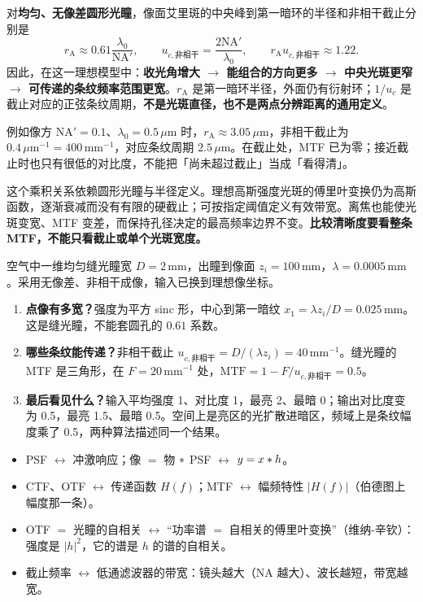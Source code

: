 \begin{idea}
对\textbf{均匀、无像差圆形光瞳}，像面艾里斑的中央峰到第一暗环的半径和非相干截止分别是
\[
r_{\mathrm A}\approx0.61\frac{\lambda_0}{\mathrm{NA}'},\qquad
u_{c,\text{非相干}}=\frac{2\mathrm{NA}'}{\lambda_0},\qquad
r_{\mathrm A}u_{c,\text{非相干}}\approx1.22.
\]
因此，在这一理想模型中：\textbf{收光角增大 $\to$ 能组合的方向更多 $\to$ 中央光斑更窄 $\to$ 可传递的条纹频率范围更宽}。$r_{\mathrm A}$ 是第一暗环半径，外面仍有衍射环；$1/u_c$ 是截止对应的正弦条纹周期，\textbf{不是光斑直径，也不是两点分辨距离的通用定义}。

例如像方 $\mathrm{NA}'=0.1$、$\lambda_0=0.5\,\mu\mathrm m$ 时，$r_{\mathrm A}\approx3.05\,\mu\mathrm m$，非相干截止为 $0.4\,\mu\mathrm m^{-1}=400\,\mathrm{mm}^{-1}$，对应条纹周期 $2.5\,\mu\mathrm m$。在截止处，MTF 已为零；接近截止时也只有很低的对比度，不能把「尚未超过截止」当成「看得清」。

这个乘积关系依赖圆形光瞳与半径定义。理想高斯强度光斑的傅里叶变换仍为高斯函数，逐渐衰减而没有有限的硬截止；可按指定阈值定义有效带宽。离焦也能使光斑变宽、MTF 变差，而保持孔径决定的最高频率边界不变。\textbf{比较清晰度要看整条 MTF，不能只看截止或单个光斑宽度。}
\end{idea}

空气中一维均匀缝光瞳宽 $D=2\,\mathrm{mm}$，出瞳到像面 $z_i=100\,\mathrm{mm}$，$\lambda=0.0005\,\mathrm{mm}$。采用无像差、非相干成像，输入已换到理想像坐标。
\begin{enumerate}
\item \textbf{点像有多宽？}强度为平方 sinc 形，中心到第一暗纹 $x_1=\lambda z_i/D=0.025\,\mathrm{mm}$。这是缝光瞳，不能套圆孔的 $0.61$ 系数。
\item \textbf{哪些条纹能传递？}非相干截止 $u_{c,\text{非相干}}=D/(\lambda z_i)=40\,\mathrm{mm}^{-1}$。缝光瞳的 MTF 是三角形，在 $F=20\,\mathrm{mm}^{-1}$ 处，$\mathrm{MTF}=1-F/u_{c,\text{非相干}}=0.5$。
\item \textbf{最后看见什么？}输入平均强度 1、对比度 1，最亮 2、最暗 0；输出对比度变为 0.5，最亮 1.5、最暗 0.5。空间上是亮区的光扩散进暗区，频域上是条纹幅度乘了 0.5，两种算法描述同一个结果。
\end{enumerate}

\begin{idea}[类比]
\begin{itemize}
\item PSF $\leftrightarrow$ 冲激响应；像 $=$ 物 $\ast$ PSF $\leftrightarrow$ $y=x\ast h$。
\item CTF、OTF $\leftrightarrow$ 传递函数 $H(f)$；MTF $\leftrightarrow$ 幅频特性 $|H(f)|$（伯德图上幅度那一条）。
\item OTF $=$ 光瞳的自相关 $\leftrightarrow$ “功率谱 $=$ 自相关的傅里叶变换”（维纳-辛钦）：强度是 $|h|^2$，它的谱是 $h$ 的谱的自相关。
\item 截止频率 $\leftrightarrow$ 低通滤波器的带宽：镜头越大（NA 越大）、波长越短，带宽越宽。
\end{itemize}
\end{idea}

